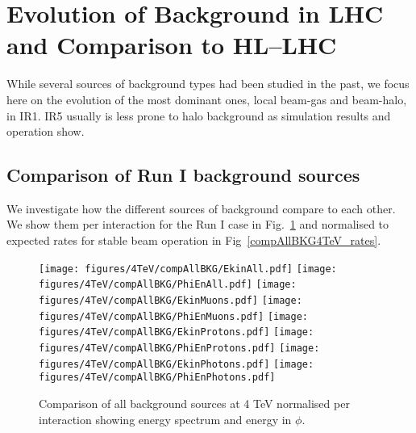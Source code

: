 \newpage
\section{Evolution of Background in LHC and Comparison to HL--LHC\label{evolut}}

While several sources of background types had been studied in the past, we focus here on the evolution of the most dominant ones, local beam-gas and beam-halo, in IR1. IR5 usually is less prone to halo background as simulation results and operation show.




\subsection{Comparison of Run I background sources}
We investigate how the different sources of background compare to each other. We show them per interaction for the Run I case in Fig.~\ref{fig:compAllBKG_perInt1} and normalised to expected rates for stable beam operation in Fig~\ref{compAllBKG4TeV_rates}.

\begin{figure}
\begin{center}
  \texttt{[image: figures/4TeV/compAllBKG/EkinAll.pdf]}
  \texttt{[image: figures/4TeV/compAllBKG/PhiEnAll.pdf]}
  \texttt{[image: figures/4TeV/compAllBKG/EkinMuons.pdf]}
  \texttt{[image: figures/4TeV/compAllBKG/PhiEnMuons.pdf]}
  \texttt{[image: figures/4TeV/compAllBKG/EkinProtons.pdf]}
  \texttt{[image: figures/4TeV/compAllBKG/PhiEnProtons.pdf]}
  \texttt{[image: figures/4TeV/compAllBKG/EkinPhotons.pdf]}
  \texttt{[image: figures/4TeV/compAllBKG/PhiEnPhotons.pdf]}
\end{center}
\vspace{-0.6cm}
 \caption{Comparison of all background sources at 4 TeV normalised per interaction showing energy spectrum and energy in $\phi$.
  \label{fig:compAllBKG_perInt1}}
\end{figure}


